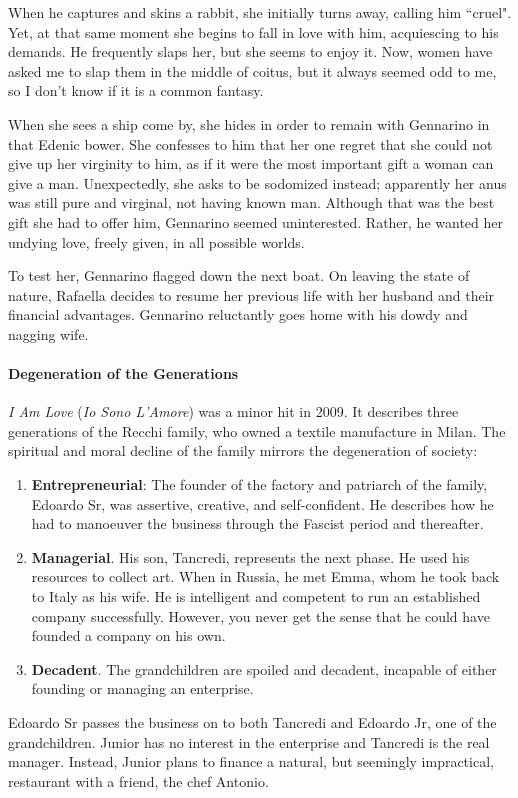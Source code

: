 When he captures and skins a rabbit, she initially turns away, calling him ``cruel". Yet, at that same moment she begins to fall in love with him, acquiescing to his demands. He frequently slaps her, but she seems to enjoy it. Now, women have asked me to slap them in the middle of coitus, but it always seemed odd to me, so I don't know if it is a common fantasy.

When she sees a ship come by, she hides in order to remain with Gennarino in that Edenic bower. She confesses to him that her one regret that she could not give up her virginity to him, as if it were the most important gift a woman can give a man. Unexpectedly, she asks to be sodomized instead; apparently her anus was still pure and virginal, not having known man. Although that was the best gift she had to offer him, Gennarino seemed uninterested. Rather, he wanted her undying love, freely given, in all possible worlds.

To test her, Gennarino flagged down the next boat. On leaving the state of nature, Rafaella decides to resume her previous life with her husband and their financial advantages. Gennarino reluctantly goes home with his dowdy and nagging wife.

\paragraph{Degeneration of the Generations}
\emph{I Am Love} (\emph{Io Sono L'Amore}) was a minor hit in 2009. It describes three generations of the Recchi family, who owned a textile manufacture in Milan. The spiritual and moral decline of the family mirrors the degeneration of society:

\begin{enumerate}
\item \textbf{Entrepreneurial}: The founder of the factory and patriarch of the family, Edoardo Sr, was assertive, creative, and self-confident. He describes how he had to manoeuver the business through the Fascist period and thereafter. 
\item \textbf{Managerial}. His son, Tancredi, represents the next phase. He used his resources to collect art. When in Russia, he met Emma, whom he took back to Italy as his wife. He is intelligent and competent to run an established company successfully. However, you never get the sense that he could have founded a company on his own. 
\item \textbf{Decadent}. The grandchildren are spoiled and decadent, incapable of either founding or managing an enterprise. 
\end{enumerate}
Edoardo Sr passes the business on to both Tancredi and Edoardo Jr, one of the grandchildren. Junior has no interest in the enterprise and Tancredi is the real manager. Instead, Junior plans to finance a natural, but seemingly impractical, restaurant with a friend, the chef Antonio.

